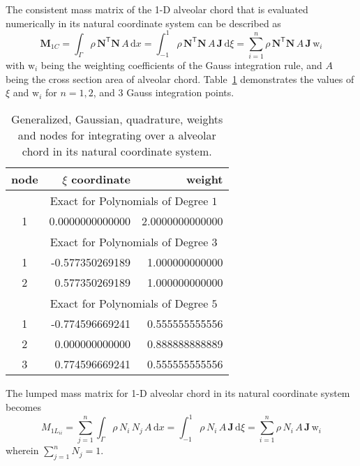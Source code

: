 The consistent mass matrix of the 1-D alveolar chord that is evaluated numerically in its natural coordinate system can be described as
\begin{equation}
    \mathbf{M}_{1C} = \int_{\Gamma} \rho \, \mathbf{N}^{\mathsf{T}} \mathbf{N} \, A \, \mathrm{d} x  = \int_{-1}^{1} \rho \, \mathbf{N}^{\mathsf{T}} \mathbf{N}\, A \, \mathbf{J}\,  \mathrm{d} \xi =  \sum_{i=1}^{n}  \rho  \, \mathbf{N}^{\mathsf{T}} \mathbf{N} \, A\, \mathbf{J} \, \mathrm{w}_i
\end{equation}
 with $\mathrm{w}_i$ being the  weighting coefficients of the Gauss integration rule, and $A$ being the cross section area of alveolar chord. Table~\ref{tabQuadrature1D} demonstrates the values of $\xi$ and $\mathrm{w}_i$ for $n = 1, 2$, and $3$ Gauss integration points.
\begin{table}
    \centering
    \begin{tabular}{|c|rr|}
        \hline
        node & \centering $\xi$ coordinate \phantom{12}  & 
        weight \phantom{12} \\ \hline
        & \multicolumn{2}{|c|}{Exact for Polynomials of Degree $1^{\phantom{|^|}}$} \\ 
        \hline
        1 & 0.0000000000000 & 2.0000000000000 \\ 
        \hline
        & \multicolumn{2}{|c|}{Exact for Polynomials of Degree $3^{\phantom{|^|}}$} \\ \hline
        1 & -0.577350269189 & 1.000000000000\\
        2 & 0.577350269189 & 1.000000000000\\ 
        \hline
        & \multicolumn{2}{|c|}{Exact for Polynomials of Degree $5^{\phantom{|^|}}$} \\ \hline
        1 & -0.774596669241 & 0.555555555556 \\
        2 & 0.000000000000 & 0.888888888889\\
        3 & 0.774596669241 & 0.555555555556\\ 
        \hline
    \end{tabular}
    \caption{Generalized, Gaussian, quadrature, weights and nodes for integrating over a alveolar chord in its natural coordinate system.}
    \label{tabQuadrature1D}
\end{table}

The lumped mass matrix for 1-D alveolar chord in its natural coordinate system becomes 
\begin{equation}
{M}_{1L_{ii}} = \sum_{j=1}^n \int_{\Gamma} \rho \, N_i \, N_j \, A \, \mathrm{d} x  = \int_{-1}^{1} \rho \, N_i\, A \, \mathbf{J}\,  \mathrm{d} \xi =  \sum_{i=1}^n  \rho  \, N_i\, A\, \mathbf{J} \, \mathrm{w}_i
\end{equation}
wherein $\sum_{j=1}^n N_j = 1$. 

